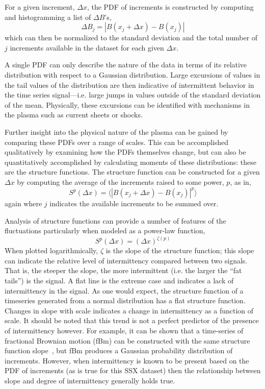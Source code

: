 \documentclass[preprint2]{aastex}
\begin{document}
For a given increment, $\Delta x$, the PDF of increments is constructed by computing and histogramming a list of $\Delta B$'s,
\begin{equation}
\Delta B_{j} = |B(x_{j}+\Delta x)-B(x_{j})|
\label{eq:increment}
\end{equation}
which can then be normalized to the standard deviation and the total number of $j$ increments available in the dataset for each given $\Delta x$.

A single PDF can only describe the nature of the data in terms of its relative distribution with respect to a Gaussian distribution. Large excursions of values in the tail values of the distribution are then indicative of intermittent behavior in the time series signal---i.e. large jumps in values outside of the standard deviation of the mean. Physically, these excursions can be identified with mechanisms in the plasma such as current sheets or shocks.

Further insight into the physical nature of the plasma can be gained by comparing these PDFs over a range of scales. This can be accomplished qualitatively by examining how the PDFs themselves change, but can also be quantitatively accomplished by calculating moments of these distributions: these are the structure functions. The structure function can be constructed for a given $\Delta x$ by computing the average of the increments raised to some power, $p$, as in,
\begin{equation}
S^{p}(\Delta x) = \langle|B(x_{j}+\Delta x)-B(x_{j})|^{p}\rangle
\label{eq:structfunc}
\end{equation}
again where $j$ indicates the available increments to be summed over. 

Analysis of structure functions can provide a number of features of the fluctuations particularly when modeled as a power-law function,
\begin{equation}
S^{p}(\Delta x) = (\Delta x)^{\zeta(p)}
\label{eq:power-law}
\end{equation}
When plotted logarithmically, $\zeta$ is the slope of the structure function; this slope can indicate the relative level of intermittency compared between two signals. That is, the steeper the slope, the more intermittent (i.e. the larger the ``fat tails'') is the signal. A flat line is the extreme case and indicates a lack of intermittency in the signal. As one would expect, the structure function of a timeseries generated from a normal distribution has a flat structure function. Changes in slope with scale indicates a change in intermittency as a function of scale. It should be noted that this trend is not a perfect predictor of the presence of intermittency however. For example, it can be shown that a time-series of fractional Brownian motion (fBm) can be constructed with the same structure function slope~\citep{hnat2003}, but fBm produces a Gaussian probability distribution of increments. However, when intermittency is known to be present based on the PDF of increments (as is true for this SSX dataset) then the relationship between slope and degree of intermittency generally holds true.
\end{document}
